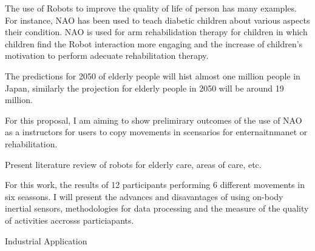 \documentclass[12pt,journal,onecolumn,compsoc]{IEEEtran}
\begin{document}


The use of Robots to improve the quality of life of person has many examples.
For instance, NAO has been used to teach diabetic children about various aspects their condition.
NAO is used for arm rehabilidation therapy for children in which children find the Robot interaction
more engaging and the increase of children's motivation to perform adecuate rehabilitation therapy.



The predictions for 2050 of elderly people will hist almost 
one million people in Japan, similarly the projection for elderly people
in 2050 will be around  19 million.


For this proposal, I am aiming to show prelimirary outcomes of the use of NAO as a instructors
for users to copy movements in scensarios for enternaitnmanet or rehabilitation.

Present literature review of robots for elderly care, areas of care, etc.

For this work, the results of 12 participants performing 6 different movements in six seassons.
I will present the advances and disavantages of using on-body inertial sensors,
methodologies for data processing and the measure of the quality of activities accrosss particiapants.


Industrial Application





\end{document}
